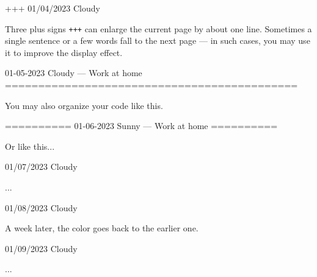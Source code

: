 \documentclass[11pt, paperstyle=light yellow, color entry, month-day-year,
  title in boldface, title in sffamily, use style = classical]{jwjournal}
\begin{document}
+++
01/04/2023  Cloudy

  Three plus signs \texttt{+++} can enlarge the current page by about one line. Sometimes a single sentence or a few words fall to the next page --- in such cases, you may use it to improve the display effect.



01-05-2023    Cloudy        --- Work at home
============================================

You may also organize your code like this.


==========
01-06-2023    Sunny         --- Work at home
==========

Or like this...



01/07/2023  Cloudy

  ...



01/08/2023  Cloudy

  A week later, the color goes back to the earlier one.



01/09/2023  Cloudy

  ...
\end{document}
